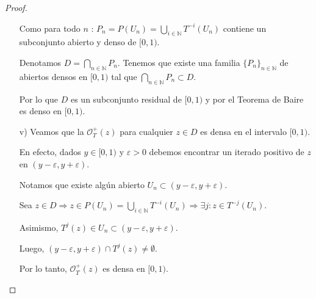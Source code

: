 \begin{proof}
\begin{itemize}
    Como para todo $n$ :  $P_{n}=P(U_{n})=\displaystyle\bigcup_{i\in\mathbb{N}}T^{-i}(U_{n})$ contiene un subconjunto abierto y denso de $[0,1)$.
    
    Denotamos $D=\displaystyle\bigcap_{n\in\mathbb{N}} P_{n}$.
    Tenemos que existe una familia $\{P_{n}\}_{n\in\mathbb{N}}$ de abiertos densos en $[0,1)$ tal que $\displaystyle\bigcap_{n\in\mathbb{N}} P_{n}\subset D$.
    
    Por lo que $D$ es un subconjunto residual de $[0,1)$ y por el Teorema de Baire es denso en $[0,1)$.
    \item[v)] Veamos que la $\mathcal{O}_{T}^{+}(z)$ para cualquier $z\in D$ es densa en el intervalo $[0,1)$.
    
    En efecto, dados $y\in[0,1)$ y $\varepsilon>0$ debemos encontrar un iterado positivo de $z$ en $(y-\varepsilon,y+\varepsilon)$.
    
    Notamos que existe algún abierto $U_{n}\subset(y-\varepsilon,y+\varepsilon)$.
    
    Sea $z\in D\Rightarrow z\in P(U_{n})=\displaystyle\bigcup_{i\in\mathbb{N}} T^{-i}(U_{n})\Rightarrow \exists j : z\in T^{-j}(U_{n})$.
    
    Asimismo, $T^{j}(z)\in U_{n}\subset(y-\varepsilon,y+\varepsilon)$.
    
    Luego, $(y-\varepsilon,y+\varepsilon)\cap T^{j}(z)\neq\emptyset$.
    
    Por lo tanto, $\mathcal{O}_{T}^{+}(z)$ es densa en $[0,1)$.
\end{itemize}
\end{proof}
